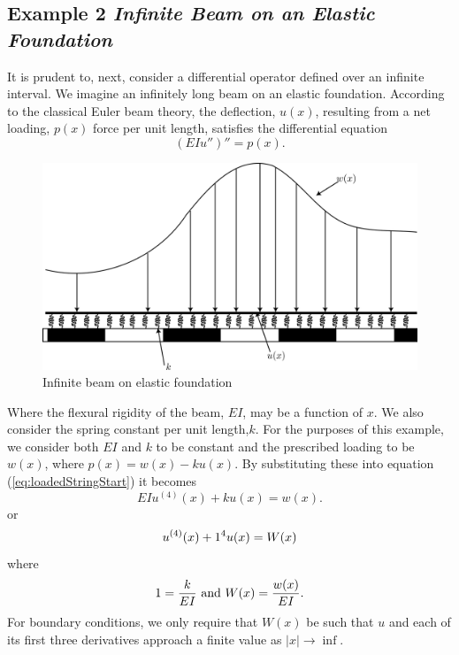     \subsection{Example 2 \textit{Infinite Beam on an Elastic Foundation}}
    It is prudent to, next, consider a differential operator defined over an infinite interval. We imagine an infinitely long beam on an elastic foundation. According to the classical Euler beam theory, the deflection, \(u(x)\), resulting from a net loading, \(p(x)\) force per unit length, satisfies the differential equation
    \begin{equation*}\label{eq:loadedStringStart}
        (EIu'')'' = p(x).
    \end{equation*}
    \begin{figure}
        \centering
        \includegraphics[width=0.75\linewidth]{include/Beam.png}
        \caption{Infinite beam on elastic foundation}
    \end{figure}

    Where the flexural rigidity of the beam, \(EI\), may be a function of \(x\). We also consider the spring constant per unit length,\(k\). For the purposes of this example, we consider both \(EI\) and \(k\) to be constant and the prescribed loading to be \(w(x)\), where \(p(x) = w(x)-ku(x)\). By substituting these into equation (\ref{eq:loadedStringStart}) it becomes
    \begin{equation*}
        EIu^{(4)}(x)+ku(x)=w(x).
    \end{equation*} 
    or
    \begin{equation*}
        u^{(4)}(x) + 1^4u(x)= W(x)
    \end{equation*}
    where
    \begin{equation*}
        1 =\frac{k}{EI} \text{ and } W(x)= \frac{w(x)}{EI}.
    \end{equation*}
    For boundary conditions, we only require that \(W(x)\) be such that \(u\) and each of its first three derivatives approach a finite value as \(|x|\to \inf\).

